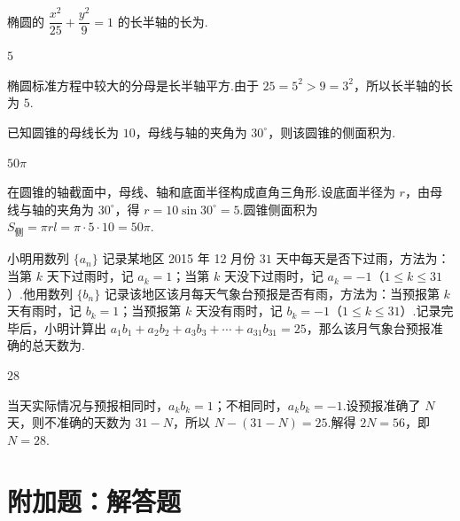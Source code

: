 \begin{problem}
椭圆的 \(\dfrac{x^2}{25}+\dfrac{y^2}{9}=1\) 的长半轴的长为\fillinblank{}.
\end{problem}

\begin{answer}
\(5\)
\end{answer}

\begin{solution}
椭圆标准方程中较大的分母是长半轴平方.由于 \(25=5^2>9=3^2\)，所以长半轴的长为 \(5\).
\end{solution}

\begin{problem}
已知圆锥的母线长为 \(10\)，母线与轴的夹角为 \(30^\circ\)，则该圆锥的侧面积为\fillinblank{}.
\end{problem}

\begin{answer}
\(50\pi\)
\end{answer}

\begin{solution}
在圆锥的轴截面中，母线、轴和底面半径构成直角三角形.设底面半径为 \(r\)，由母线与轴的夹角为 \(30^\circ\)，得
\(r=10\sin30^\circ=5\).圆锥侧面积为 \(S_{\text{侧}}=\pi r l=\pi\cdot5\cdot10=50\pi\).
\end{solution}

\begin{problem}
小明用数列 \(\{a_n\}\) 记录某地区 2015 年 12 月份 \(31\) 天中每天是否下过雨，方法为：当第 \(k\) 天下过雨时，记 \(a_k=1\)；当第 \(k\) 天没下过雨时，记 \(a_k=-1\)（\(1\leq k\leq31\)）.他用数列 \(\{b_n\}\) 记录该地区该月每天气象台预报是否有雨，方法为：当预报第 \(k\) 天有雨时，记 \(b_k=1\)；当预报第 \(k\) 天没有雨时，记 \(b_k=-1\)（\(1\leq k\leq31\)）.记录完毕后，小明计算出 \(a_1b_1+a_2b_2+a_3b_3+\cdots+a_{31}b_{31}=25\)，那么该月气象台预报准确的总天数为\fillinblank{}.
\end{problem}

\begin{answer}
\(28\)
\end{answer}

\begin{solution}
当天实际情况与预报相同时，\(a_kb_k=1\)；不相同时，\(a_kb_k=-1\).设预报准确了 \(N\) 天，则不准确的天数为 \(31-N\)，所以
\(N-(31-N)=25\).解得 \(2N=56\)，即 \(N=28\).
\end{solution}

\section{附加题：解答题}

